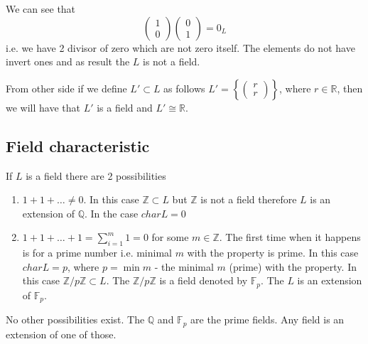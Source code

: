 \begin{example}
  We can see that
  \[
  \left(
  \begin{array}{c}
    1 \\
    0
  \end{array}
  \right)
    \left(
  \begin{array}{c}
    0 \\
    1
  \end{array}
  \right) = 0_L
  \]
  i.e. we have 2 divisor of zero which are not zero itself. The
  elements do not have invert ones and as result the $L$ is
  not a field.

  From other side if we define $L' \subset L$ as follows
  $L' = \left\{
  \left(
  \begin{array}{c}
    r \\
    r
  \end{array}
  \right)
  \right\}$, where $r \in \mathbb{R}$,
  then we will have that $L'$ is a field and $L' \cong \mathbb{R}$.
  \label{ex:kalgebranotfield}
\end{example}

\subsection{Field characteristic}
\label{sec:fieldcharacteristic}
If $L$ is a field there are 2 possibilities
\begin{enumerate}
\item $1 + 1 + \dots \ne 0$. In this case
  $\mathbb{Z} \subset L$ but $\mathbb{Z}$ is not a field therefore $L$
  is an extension of $\mathbb{Q}$. In the case $char L = 0$
  \item $1 + 1 + \dots + 1 = \sum_{i = 1}^m 1 = 0$ for some $m \in
    \mathbb{Z}$. The first time when it happens is for a prime number
    i.e. minimal $m$ with the property is prime. In this case $char L
    = p$, where $p = \min m$  - the minimal $m$ (prime) with the
    property. In this 
    case $\mathbb{Z}/p\mathbb{Z} \subset L$. The
    $\mathbb{Z}/p\mathbb{Z}$ is a field denoted by $\mathbb{F}_p$. The
    $L$ is an extension of $\mathbb{F}_p$.
\end{enumerate}
No other possibilities exist. The $\mathbb{Q}$ and $\mathbb{F}_p$ are
the prime fields. Any field is an extension of one of those.

